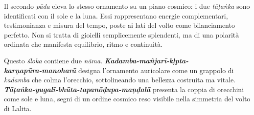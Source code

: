 Il secondo \textit{pāda} eleva lo stesso ornamento su un piano cosmico: i due \textit{tāṭaṅka} sono identificati con il sole e la luna. Essi rappresentano energie complementari, testimonianza e misura del tempo, poste ai lati del volto come bilanciamento perfetto. Non si tratta di gioielli semplicemente splendenti, ma di una polarità ordinata che manifesta equilibrio, ritmo e continuità.

Questo \textit{śloka} contiene due \textit{nāma}. \textbf{\textit{Kadamba-mañjarī-kḷpta-\\ karṇapūra-manoharā}} designa l’ornamento auricolare come un grappolo di \textit{kadamba} che colma l’orecchio, sottolineando una bellezza costruita ma vitale. \textbf{\textit{Tāṭaṅka-yugalī-bhūta-tapanōḍupa-maṇḍalā}} presenta la coppia di orecchini come sole e luna, segni di un ordine cosmico reso visibile nella simmetria del volto di Lalitā.
